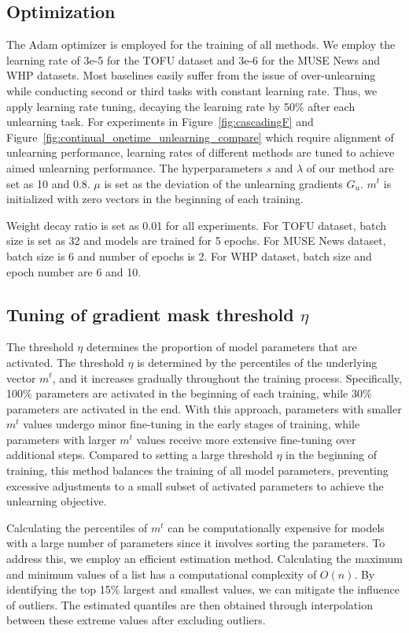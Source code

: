 \documentclass{article}
\theoremstyle{plain}
\theoremstyle{definition}
\theoremstyle{remark}
\begin{document}
\subsection{Optimization}
The Adam optimizer is employed for the training of all methods.
We employ the learning rate of 3e-5 for the TOFU dataset and 3e-6 for the MUSE News and WHP datasets.
Most baselines easily suffer from the issue of over-unlearning while conducting second or third tasks with constant learning rate.
Thus, we apply learning rate tuning, decaying the learning rate by 50\% after each unlearning task.
For experiments in Figure~\ref{fig:cascadingF} and Figure~\ref{fig:continual_onetime_unlearning_compare} which require alignment of unlearning performance, learning rates of different methods are tuned to achieve aimed unlearning performance.
The hyperparameters $s$ and $\lambda$ of our method are set as 10 and 0.8.
$\mu$ is set as the deviation of the unlearning gradients $G_u$.
$m^t$ is initialized with zero vectors in the beginning of each training.

Weight decay ratio is set as 0.01 for all experiments.
For TOFU dataset, batch size is set as 32 and models are trained for 5 epochs.
For MUSE News dataset, batch size is 6 and number of epochs is 2.
For WHP dataset, batch size and epoch number are 6 and 10.

\subsection{Tuning of gradient mask threshold $\eta$}
\label{sec:tuning_of_eta}
The threshold $\eta$ determines the proportion of model parameters that are activated.
The threshold $\eta$ is determined by the percentiles of the underlying vector $m^t$, and it increases gradually throughout the training process.
Specifically, 100\% parameters are activated in the beginning of each training, while 30\% parameters are activated in the end.
With this approach, parameters with smaller $m^t$ values undergo minor fine-tuning in the early stages of training, while parameters with larger $m^t$ values receive more extensive fine-tuning over additional steps.
Compared to setting a large threshold $\eta$ in the beginning of training, this method balances the training of all model parameters, preventing excessive adjustments to a small subset of activated parameters to achieve the unlearning objective.

Calculating the percentiles of $m^t$ can be computationally expensive for models with a large number of parameters since it involves sorting the parameters.
To address this, we employ an efficient estimation method.
Calculating the maximum and minimum values of a list has a computational complexity of $O(n)$.
By identifying the top 15\% largest and smallest values, we can mitigate the influence of outliers.
The estimated quantiles are then obtained through interpolation between these extreme values after excluding outliers.
\end{document}
